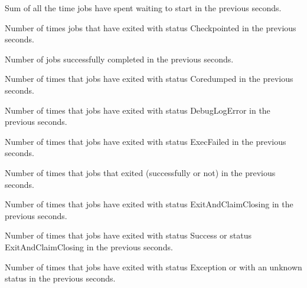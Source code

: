 \begin{description}
\item[\AdAttr{JobsAccumTimeToStart}:] Sum of all the time jobs have spent waiting to start
  in the previous  seconds.

\item[\AdAttr{JobsCheckpointed}:] Number of times jobs that have exited with status Checkpointed
  in the previous  seconds.

\item[\AdAttr{JobsCompleted}:] Number of jobs successfully completed
  in the previous  seconds.

\item[\AdAttr{JobsCoredumped}:] Number of times that jobs have exited with status Coredumped
  in the previous  seconds.

\item[\AdAttr{JobsDebugLogError}:] Number of times that jobs have exited with status DebugLogError
  in the previous  seconds.

\item[\AdAttr{JobsExecFailed}:] Number of times that jobs have exited with status ExecFailed
  in the previous  seconds.

\item[\AdAttr{JobsExited}:] Number of times that jobs that exited (successfully or not)
  in the previous  seconds.

\item[\AdAttr{JobsExitedAndClaimClosing}:] Number of times that jobs have exited with status ExitAndClaimClosing
  in the previous  seconds.

\item[\AdAttr{JobsExitedNormally}:] Number of times that jobs have exited with status Success or status ExitAndClaimClosing
  in the previous  seconds.

\item[\AdAttr{JobsExitException}:] Number of times that jobs have exited with status Exception or with an unknown status
  in the previous  seconds.


\end{description}
